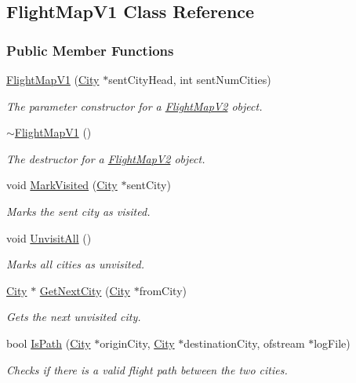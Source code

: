 \hypertarget{class_flight_map_v1}{}\subsection{Flight\+Map\+V1 Class Reference}
\label{class_flight_map_v1}
\subsubsection*{Public Member Functions}
\begin{DoxyCompactItemize}
\item 
\hyperlink{class_flight_map_v1_ad60d003af630200985e473c8573a921a}{Flight\+Map\+V1} (\hyperlink{class_city}{City} $\ast$sent\+City\+Head, int sent\+Num\+Cities)
\begin{DoxyCompactList}\small\item\em The parameter constructor for a \hyperlink{class_flight_map_v2}{Flight\+Map\+V2} object. \end{DoxyCompactList}\item 
\hyperlink{class_flight_map_v1_a3324c67900bb832ce364db5fb771e6d9}{$\sim$\+Flight\+Map\+V1} ()
\begin{DoxyCompactList}\small\item\em The destructor for a \hyperlink{class_flight_map_v2}{Flight\+Map\+V2} object. \end{DoxyCompactList}\item 
void \hyperlink{class_flight_map_v1_a0c8cb89878e3c0bc24f0c56521d0050c}{Mark\+Visited} (\hyperlink{class_city}{City} $\ast$sent\+City)
\begin{DoxyCompactList}\small\item\em Marks the sent city as visited. \end{DoxyCompactList}\item 
void \hyperlink{class_flight_map_v1_aa741f66d5202ee655cc62e30d4ebdc4d}{Unvisit\+All} ()
\begin{DoxyCompactList}\small\item\em Marks all cities as unvisited. \end{DoxyCompactList}\item 
\hyperlink{class_city}{City} $\ast$ \hyperlink{class_flight_map_v1_aa45942365bca307f04fd5b1e29ef6820}{Get\+Next\+City} (\hyperlink{class_city}{City} $\ast$from\+City)
\begin{DoxyCompactList}\small\item\em Gets the next unvisited city. \end{DoxyCompactList}\item 
bool \hyperlink{class_flight_map_v1_a14d98d385246d5ab764b0b916563188b}{Is\+Path} (\hyperlink{class_city}{City} $\ast$origin\+City, \hyperlink{class_city}{City} $\ast$destination\+City, ofstream $\ast$log\+File)
\begin{DoxyCompactList}\small\item\em Checks if there is a valid flight path between the two cities. \end{DoxyCompactList}\end{DoxyCompactItemize}
